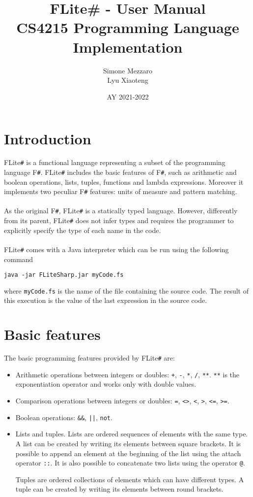 \documentclass[]{article}
\title{\huge FLite\# - User Manual\\ \vspace{20pt} \large CS4215 Programming Language Implementation}
\author{Simone Mezzaro\\Lyu Xiaoteng}
\date{AY 2021-2022}
\begin{document}
	\maketitle
	\vspace{200pt}
	\tableofcontents
	\newpage
	
	\section{Introduction}
		FLite\verb|#| is a functional language representing a subset of the programming language F\verb|#|. FLite\verb|#| includes the basic features of F\verb|#|, such as arithmetic and boolean operations, lists, tuples, functions and lambda expressions. Moreover it implements two peculiar F\verb|#| features: units of measure and pattern matching.\\\\
		As the original F\verb|#|, FLite\verb|#| is a statically typed language. However, differently from its parent, FLite\verb|#| does not infer types and requires the programmer to explicitly specify the type of each name in the code.\\\\
		FLite\verb|#| comes with a Java interpreter which can be run using the following command 
		\begin{center}
			\lstinline|java -jar FLiteSharp.jar myCode.fs|
		\end{center}
		where \lstinline|myCode.fs| is the name of the file containing the source code. The result of this execution is the value of the last expression in the source code.
	
	\section{Basic features}
		The basic programming features provided by FLite\verb|#| are:
		\begin{itemize}
			\item Arithmetic operations between integers or doubles: \lstinline|+|, \lstinline|-|, \lstinline|*|, \lstinline|/|, \lstinline|**|. \lstinline|**| is the exponentiation operator and works only with double values.
			\item Comparison operations between integers or doubles: \lstinline|=|, \lstinline|<>|, \lstinline|<|, \lstinline|>|, \lstinline|<=|, \lstinline|>=|.
			\item Boolean operations: \lstinline|&&|, \lstinline!||!, \lstinline|not|.
			\item Lists and tuples. Lists are ordered sequences of elements with the same type. A list can be created by writing its elements between square brackets. It is possible to append an element at the beginning of the list using the attach operator \lstinline|::|. It is also possible to concatenate two lists using the operator \lstinline|@|.
			
			Tuples are ordered collections of elements which can have different types. A tuple can be created by writing its elements between round brackets.
		\end{itemize}
	
\end{document}
